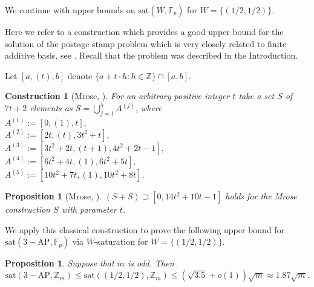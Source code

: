 \documentclass[11pt]{article}
\numberwithin{table}{section}
\newcommand{\F}{{\mathbb F}}
\newcommand{\sat}{\mathrm{sat}}
\newtheorem{constr}[theorem]{\bf Construction}
\newtheorem{prop}[theorem]{\bf Proposition}
\theoremstyle{definition}
\begin{document}
	We continue with upper bounds on $\sat(W,\F_p)$ for $W=\{(1/2, 1/2)\}$.
	
	Here we refer to a construction which provides a good upper bound for the solution of the postage stamp problem which is very closely related to finite additive basis, see \cite{Nath, Habsi, Hof}. Recall that the problem was described in the Introduction.
	
	
	
	Let $[a,(t), b]$ denote $\{a+t\cdot h: h\in \mathbb{Z}\}\cap [a,b]$.
	\begin{constr}[Mrose, \cite{Mrose}]
		\label{Mr}
		For an arbitrary positive integer $t$ take a set $S$ of $7t+2$ elements as $S=\bigcup_{j=1}^5 A^{(j)}$, where\\ 
		$A^{(1)}:=[0, (1), t],$\\ $ A^{(2)}:= [2t, (t), 3t^2+t],$\\ $ A^{(3)}:=[3t^2+2t, (t+1), 4t^2+2t-1],$\\ $ A^{(4)}:=[6t^2+4t, (1), 6t^2+5t],$\\ $A^{(5)}:=[10t^2+7t, (1), 10t^2+8t]$. 
	\end{constr}
	
	\begin{prop}[Mrose, \cite{Mrose}] \label{Mrose1}
		$(S+S)\supset [0, 14t^2+10t-1]$ holds for the Mrose construction $S$ with parameter $t$. 
	\end{prop}
	
	We apply this classical construction to prove the following upper bound for $\sat(3-\mathrm{AP}, \F_p)$ via $W$-saturation for $W=\{(1/2, 1/2)\}$.
	
	\begin{prop} Suppose that $m$ is odd. Then
		\[\sat(3-\mathrm{AP},\mathbb{Z}_m) \leq \sat((1/2, 1/2), \mathbb{Z}_m)\leq (\sqrt{3.5}+o(1))\sqrt{m}\approx 1.87\sqrt{m}.\]
	\end{prop}
	
\end{document}
